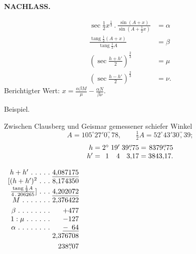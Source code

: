 \par\clearpage
\noindent{}\hfill{\small\textbf{NACHLASS.}}\hfill\null\par\medskip
\[
\begin{aligned}
\sec\tfrac12x^{\frac13}\,.\,\frac{\sin(A+x)}{\sin(A+\frac12x)}&=\alpha\\[4pt]
\frac{\operatorname{tang}\frac12(A+x)}{\operatorname{tang}\frac12A}&=\beta\\[4pt]
\left(\sec\frac{h+h'}2\right)^{\frac23}&=\mu\\[4pt]
\left(\sec\frac{h-h'}2\right)^{\frac23}&=\nu.
\end{aligned}
\]
\noindent Berichtigter Wert: $\displaystyle x=\frac{\alpha\beta M}{\mu}-\frac{\alpha N}{\beta\nu}$.
\begin{center}Beispiel.\end{center}
\noindent Zwischen Clausberg und Geismar gemessener schiefer Winkel
\[
A=105^\circ27'0\overset{\prime\prime}{,}78,\qquad
\tfrac12A=52^\circ43'30\overset{\prime\prime}{,}39;
\]
\[
\begin{array}{r@{\;}c@{\;}r@{\;}r@{\;}r@{\;}c@{\;}r}
h&=&2^\circ&19'&39\overset{\prime\prime}{,}75&=&8379\overset{\prime\prime}{,}75\\
h'&=&1&4&3{,}17&=&3843{,}17.
\end{array}
\]
\noindent\begin{minipage}[t]{.31\linewidth}\centering
$\begin{array}{r@{\ }r}
h+h'\ .\ .\ .\ .\ .&\underline{4{,}087175}\\
{[}(h+h')^2\ .\ .\ .&8{,}174350\\
\frac{\operatorname{tang}\frac12A}{4\,.\,206265}]\ .\ .\ .&\underline{4{,}202072}\\
M\ .\ .\ .\ .\ .\ .\ .&2{,}376422\\[3pt]
\beta\ .\ .\ .\ .\ .\ .\ .\ .&+477\\
1:\mu\ .\ .\ .\ .\ .\ .&-127\\
\alpha\ .\ .\ .\ .\ .\ .\ .\ .&\underline{-\phantom{1}64}\\
&2{,}376708\\[3pt]
&238\overset{\prime\prime}{,}07
\end{array}$
\end{minipage}\hfill
